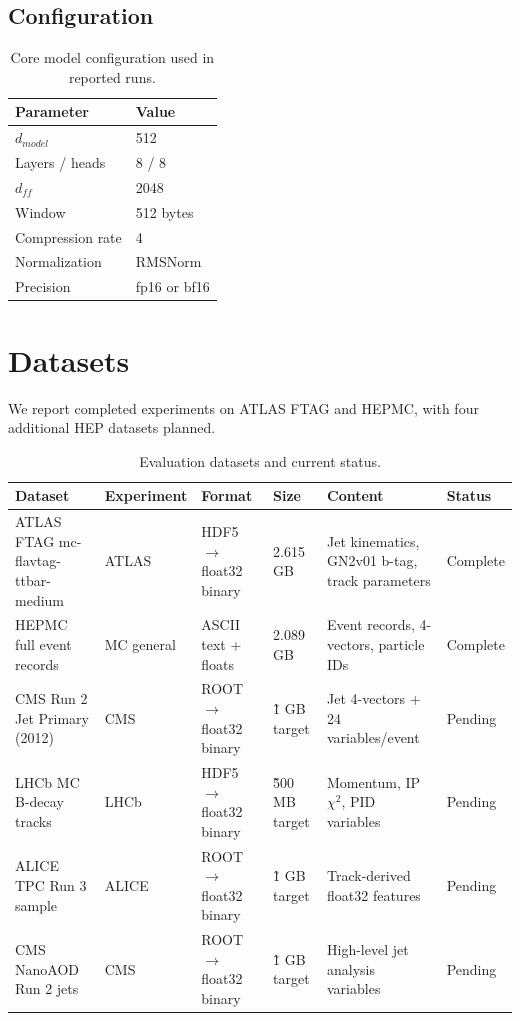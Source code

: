 \documentclass[10pt,twocolumn]{article}
\begin{document}
\subsection{Configuration}
\begin{table}[h]
\centering
\small
\caption{Core model configuration used in reported runs.}
\label{tab:model_config}
\begin{tabular}{@{}ll@{}}
\toprule
Parameter & Value \\
\midrule
$d_{model}$ & 512 \\
Layers / heads & 8 / 8 \\
$d_{ff}$ & 2048 \\
Window & 512 bytes \\
Compression rate & 4 \\
Normalization & RMSNorm \\
Precision & fp16 or bf16 \\
\bottomrule
\end{tabular}
\end{table}

\section{Datasets}
We report completed experiments on ATLAS FTAG and HEPMC, with four additional HEP datasets planned.

\begin{table}[t]
\centering
\small
\caption{Evaluation datasets and current status.}
\label{tab:datasets}
\begin{tabular}{@{}llllll@{}}
\toprule
Dataset & Experiment & Format & Size & Content & Status \\
\midrule
ATLAS FTAG mc-flavtag-ttbar-medium & ATLAS & HDF5 $\rightarrow$ float32 binary & 2.615 GB & Jet kinematics, GN2v01 b-tag, track parameters & Complete \\
HEPMC full event records & MC general & ASCII text + floats & 2.089 GB & Event records, 4-vectors, particle IDs & Complete \\
CMS Run 2 Jet Primary (2012) & CMS & ROOT $\rightarrow$ float32 binary & \~1 GB target & Jet 4-vectors + 24 variables/event & Pending \\
LHCb MC B-decay tracks & LHCb & HDF5 $\rightarrow$ float32 binary & \~500 MB target & Momentum, IP $\chi^2$, PID variables & Pending \\
ALICE TPC Run 3 sample & ALICE & ROOT $\rightarrow$ float32 binary & \~1 GB target & Track-derived float32 features & Pending \\
CMS NanoAOD Run 2 jets & CMS & ROOT $\rightarrow$ float32 binary & \~1 GB target & High-level jet analysis variables & Pending \\
\bottomrule
\end{tabular}
\end{table}
\end{document}

